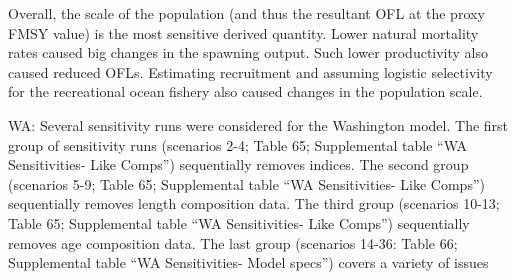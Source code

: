 \documentclass[11pt,
  english,
  letterpaper,
]{article}
\begin{document}
Overall, the scale of the population (and thus the resultant OFL at the proxy FMSY value) is the most sensitive derived quantity. Lower natural mortality rates caused big changes in the spawning output. Such lower productivity also caused reduced OFLs. Estimating recruitment and assuming logistic selectivity for the recreational ocean fishery also caused changes in the population scale.

WA: Several sensitivity runs were considered for the Washington model. The first group of sensitivity runs (scenarios 2-4; Table 65; Supplemental table ``WA Sensitivities- Like Comps'') sequentially removes indices. The second group (scenarios 5-9; Table 65; Supplemental table ``WA Sensitivities- Like Comps'') sequentially removes length composition data. The third group (scenarios 10-13; Table 65; Supplemental table ``WA Sensitivities- Like Comps'') sequentially removes age composition data. The last group (scenarios 14-36: Table 66; Supplemental table ``WA Sensitivities- Model specs'') covers a variety of issues
\end{document}
